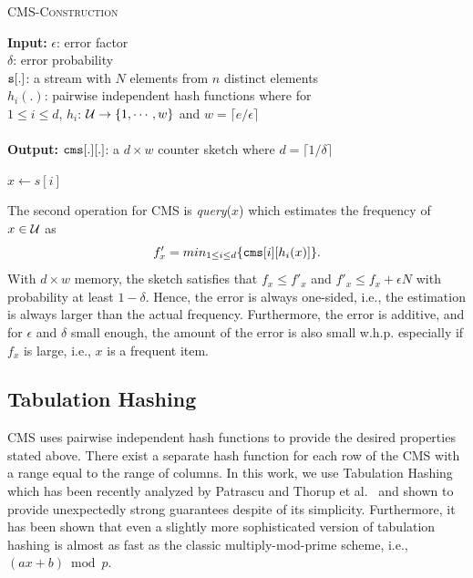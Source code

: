 \documentclass[10pt, conference, compsocconf]{IEEEtran}
\renewcommand{\algorithmicrequire}{\textbf{Input:}}
\renewcommand{\algorithmicensure}{\textbf{Output:}}
\begin{document}
 \begin{algorithm}[htbp]
  	\small
  	\caption{\textsc{CMS-Construction}} 
  	\algorithmicrequire{  $\epsilon$: error factor\\
	 		\hspace*{6ex} $\delta$: error probability \\
	 	  \hspace*{7ex}${\tt s}[.]$: a stream with $N$ elements from $n$ distinct elements \\ 
		  \hspace*{7ex}$h_i(.)$: pairwise independent hash functions where for \\ 
		  \hspace*{13ex}$1\leq i \leq d$,  $h_i$: ${\cal U} \rightarrow \{1,\cdots,w\}$ and $w = \lceil e/\epsilon \rceil$\\ \\}
	 \algorithmicensure{ ${\tt cms}[.][.]$: a $d \times w$ counter sketch where $d = \lceil 1/\delta \rceil$ \\
	 }
  	\begin{algorithmic}[1]
			\EndFor
		\EndFor
			\State $x  \leftarrow s[i]$
			\EndFor
		\EndFor
	\end{algorithmic}
	\label{alg:cms_construct}
\end{algorithm} 	

 
The second operation for CMS is {\em query}($x$) which estimates the frequency of $x \in {\cal U}$ as $$f'_x = min_{1 \leq i \leq d}\{{\tt cms}[i][h_i(x)]\}.$$
\noindent With $d \times w$ memory, the sketch satisfies that
 $f_x \leq f'_x$ and $f'_x \leq f_x + \epsilon N$ with probability at least $1 - \delta$. Hence, the error is always one-sided, i.e., the
 estimation is always larger than the actual frequency. Furthermore, the error is additive, and for $\epsilon$ and $\delta$ small enough, the amount of the error 
 is also small w.h.p. especially if $f_x$  is large, i.e., $x$ is a frequent item. 

\subsection{Tabulation Hashing}

CMS uses pairwise independent hash functions to provide the desired properties stated above. There exist a separate hash function for each row of the CMS with a range equal 
to the range of columns. In this work, we use Tabulation Hashing~\cite{zobrist1970} which has been recently analyzed by Patrascu and Thorup et al.~\cite{patrascu2012,thorup2017} and shown to provide unexpectedly strong guarantees despite of its simplicity. Furthermore, it has been shown that even a slightly more sophisticated version of tabulation hashing is almost as fast as the classic multiply-mod-prime scheme, i.e., $(ax + b) \bmod p$. 
\end{document}
